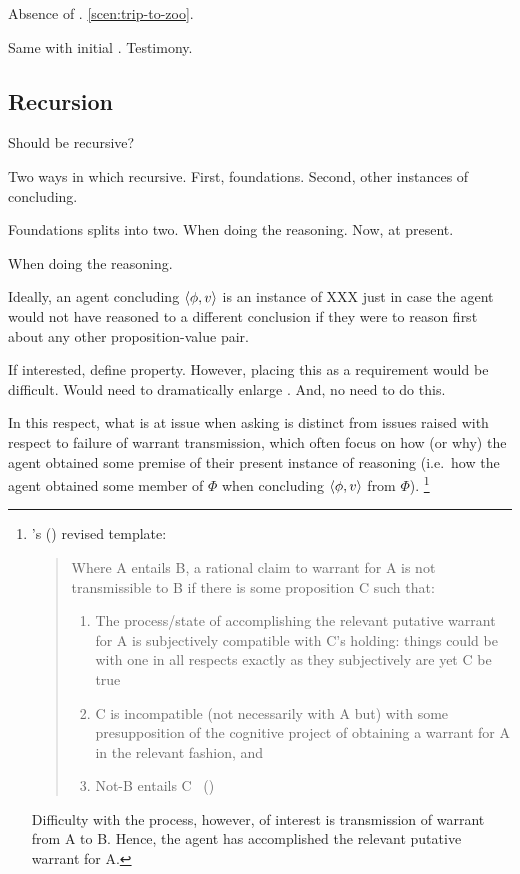 \begin{note}
  Absence of \curb{}.
  \autoref{scen:trip-to-zoo}.

  Same with initial .
  Testimony.
\end{note}

\subsection{Recursion}
\label{cha:zS:sec:question:recursion}

\begin{note}
  Should \qzS{} be recursive?

  Two ways in which recursive.
  First, foundations.
  Second, other instances of concluding.
\end{note}

\begin{note}
  Foundations splits into two.
  When doing the reasoning.
  Now, at present.

  When doing the reasoning.

  Ideally, an agent concluding \(\langle \phi, v \rangle\) is an instance of XXX  just in case the agent would not have reasoned to a different conclusion if they were to reason first about any other proposition-value pair.

  If interested, define property.
  However, placing this as a requirement would be difficult.
  Would need to dramatically enlarge .
  And, no need to do this.

  In this respect, what is at issue when asking \qzS{} is distinct from issues raised with respect to failure of warrant transmission, which often focus on how (or why) the agent obtained some premise of their present instance of reasoning (i.e.\ how the agent obtained some member of \(\Phi\) when concluding \(\langle \phi, v \rangle\) from \(\Phi\)).%
  \footnote{
    \citeauthor{Wright:2011wn}'s (\citeyear{Wright:2011wn}) revised template:
    \begin{quote}
      Where A entails B, a rational claim to warrant for A is not transmissible to B if there is some proposition C such that:
      \begin{enumerate}[label=(\roman*), noitemsep]
      \item
        The process/state of accomplishing the relevant putative warrant for A is subjectively compatible with C’s holding: things could be with one in all respects exactly as they subjectively are yet C be true
      \item
        C is incompatible (not necessarily with A but) with some presupposition of the cognitive project of obtaining a warrant for A in the relevant fashion, and
      \item
        Not-B entails C%
      \mbox{ }\hfill\mbox{(\citeyear[93]{Wright:2011wn})}
      \end{enumerate}
    \end{quote}
    Difficulty with the process, however, of interest is transmission of warrant from A to B.
    Hence, the agent has accomplished the relevant putative warrant for A.

}
\end{note}
